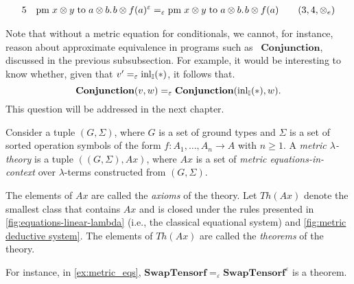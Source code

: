 \begin{example}
\begin{equation*}
\begin{split}
  5\hspace{10 pt}& \text{pm} \hspace{3 pt} x \otimes y\hspace{3 pt} \text{to} \hspace{3 pt} a \otimes b. \hspace{1pt} b \otimes f(a)^{\varepsilon} =_{\varepsilon} \text{pm} \hspace{3 pt} x \otimes y\hspace{3 pt} \text{to} \hspace{3 pt} a \otimes b. \hspace{1pt} b \otimes f(a) & \hspace{10pt} \text{($3,4,\otimes_e$)}
  \end{split}
  \end{equation*}
\end{example}

Note that without a metric equation for conditionals, we cannot, for instance, reason about approximate equivalence in programs such as  $\textbf{Conjunction}$, discussed in the previous subsubsection. For example, it would be interesting to know whether, given that \( v' =_{\varepsilon} \mathrm{inl}_{\mathbb{I}}(*) \), it follows that.
\[
\textbf{Conjunction}(v, w) =_{\varepsilon} \textbf{Conjunction}(\mathrm{inl}_{\mathbb{I}}(*), w).
\]
This question will be addressed in the next chapter.


\begin{definition} \label{def:metric_lambda_theory}
  Consider a tuple \( (G, \Sigma) \), where \( G \) is a set of ground types and \( \Sigma \) is a set of sorted operation symbols of the form \( f : A_1, \ldots, A_n \to A \) with \( n \geq 1 \). A \emph{metric $\lambda$-theory} is a tuple \( ((G, \Sigma), Ax) \), where \( Ax \) is a set of \emph{metric equations-in-context} over  $\lambda$-terms constructed from \( (G, \Sigma) \).
\end{definition}

The elements of \( Ax \) are called the \emph{axioms} of the theory. Let \( Th(Ax) \) denote the smallest class that contains \( Ax \) and is closed under the rules presented in \autoref{fig:equations-linear-lambda} (i.e., the classical equational system) and \autoref{fig:metric deductive system}. The elements of \( Th(Ax) \) are called the \emph{theorems} of the theory.

For instance, in \autoref{ex:metric_eqs}, $\textbf{SwapTensorf} =_{\varepsilon} \textbf{SwapTensorf}^\varepsilon$ is a theorem.



